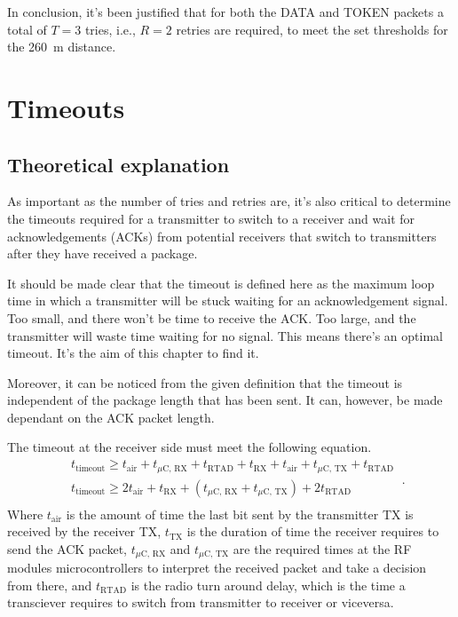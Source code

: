 In conclusion, it's been justified that for both the DATA and TOKEN packets a total of $T=3$ tries, i.e., $R=2$ retries are required, to meet the set thresholds for the \SI{260}{\m} distance.









\section{Timeouts}

\subsection{Theoretical explanation}
As important as the number of tries and retries are, it's also critical to determine the timeouts required for a transmitter to switch to a receiver and wait for acknowledgements (ACKs) from potential receivers that switch to transmitters after they have received a package.

It should be made clear that the timeout is defined here as the maximum loop time in which a transmitter will be stuck waiting for an acknowledgement signal. Too small, and there won't be time to receive the ACK. Too large, and the transmitter will waste time waiting for no signal. This means there's an optimal timeout. It's the aim of this chapter to find it. 

Moreover, it can be noticed from the given definition that the timeout is independent of the package length that has been sent. It can, however, be made dependant on the ACK packet length.

The timeout at the receiver side must meet the following equation.
\begin{equation}
	\begin{split}
	& t_{\text{timeout}} \geq t_{\text{air}} + t_{\mu \text{C, RX}} + t_{\text{RTAD}} + t_{\text{RX}} + t_{\text{air}} + t_{\mu \text{C, TX}} + t_{\text{RTAD}}  \\
	& t_{\text{timeout}} \geq 2 t_{\text{air}} + t_{\text{RX}} + \left(  t_{\mu \text{C, RX}} + t_{\mu \text{C, TX}} \right) +  2 t_{\text{RTAD}}  \\
	\end{split} \ .
	\label{eq:timeout}
\end{equation}
Where $t_{\text{air}}$ is the amount of time the last bit sent by the transmitter TX is received by the receiver TX, $t_{\text{TX}}$ is the duration of time the receiver requires to send the ACK packet, $t_{\mu \text{C, RX}}$ and $t_{\mu \text{C, TX}}$ are the required times at the RF modules microcontrollers to interpret the received packet and take a decision from there, and $t_{\text{RTAD}}$ is the radio turn around delay, which is the time a transciever requires to switch from transmitter to receiver or viceversa.


